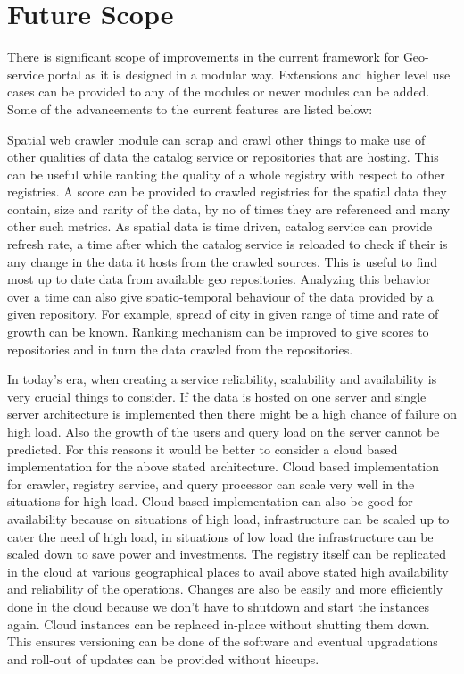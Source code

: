 \section{Future Scope}
There is significant scope of improvements in the current framework for Geo-service portal as it is designed in a modular way. Extensions and higher level use cases can be provided to any of the modules or newer modules can be added. Some of the advancements to the current features are listed below:
\newline
\par Spatial web crawler module can scrap and crawl other things to make use of other qualities of data the catalog service or repositories that are hosting. This can be useful while ranking the quality of a whole registry with respect to other registries. A score can be provided to crawled registries for the spatial data they contain, size and rarity of the data, by no of times they are referenced and many other such metrics. As spatial data is time driven, catalog service can provide refresh rate, a time after which the catalog service is reloaded to check if their is any change in the data it hosts from the crawled sources. This is useful to find most up to date data from available geo repositories. Analyzing this behavior over a time can also give spatio-temporal behaviour of the data provided by a given repository. For example, spread of city in given range of time and rate of growth can be known. Ranking mechanism can be improved to give scores to repositories and in turn the data crawled from the repositories.
\newpage
\par In today's era, when creating a service reliability, scalability and availability is very crucial things to consider. If the data is hosted on one server and single server architecture is implemented then there might be a high chance of failure on high load. Also the growth of the users and query load on the server cannot be predicted. For this reasons it would be better to consider a cloud based implementation for the above stated architecture. Cloud based implementation for crawler, registry service, and query processor can scale very well in the situations for high load. Cloud based implementation can also be good for availability because on situations of high load, infrastructure can be scaled up to cater the need of high load, in situations of low load the infrastructure can be scaled down to save power and investments. The registry itself can be replicated in the cloud at various geographical places to avail above stated high availability and reliability of the operations. Changes are also be easily and more efficiently done in the cloud because we don't have to shutdown and start the instances again. Cloud instances can be replaced in-place without shutting them down. This ensures versioning can be done of the software and eventual upgradations and roll-out of updates can be provided without hiccups.\\
